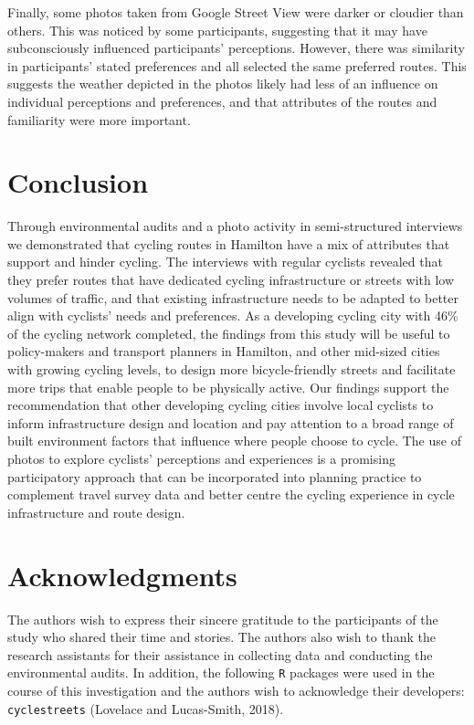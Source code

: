 \documentclass[]{elsarticle} %
\begin{document}
Finally, some photos taken from Google Street View were darker or
cloudier than others. This was noticed by some participants, suggesting
that it may have subconsciously influenced participants' perceptions.
However, there was similarity in participants' stated preferences and
all selected the same preferred routes. This suggests the weather
depicted in the photos likely had less of an influence on individual
perceptions and preferences, and that attributes of the routes and
familiarity were more important.

\hypertarget{sec:conclusion}{%
\section{Conclusion}\label{sec:conclusion}}

Through environmental audits and a photo activity in semi-structured
interviews we demonstrated that cycling routes in Hamilton have a mix of
attributes that support and hinder cycling. The interviews with regular
cyclists revealed that they prefer routes that have dedicated cycling
infrastructure or streets with low volumes of traffic, and that existing
infrastructure needs to be adapted to better align with cyclists' needs
and preferences. As a developing cycling city with 46\% of the cycling
network completed, the findings from this study will be useful to
policy-makers and transport planners in Hamilton, and other mid-sized
cities with growing cycling levels, to design more bicycle-friendly
streets and facilitate more trips that enable people to be physically
active. Our findings support the recommendation that other developing
cycling cities involve local cyclists to inform infrastructure design
and location and pay attention to a broad range of built environment
factors that influence where people choose to cycle. The use of photos
to explore cyclists' perceptions and experiences is a promising
participatory approach that can be incorporated into planning practice
to complement travel survey data and better centre the cycling
experience in cycle infrastructure and route design.

\hypertarget{sec:acknowledgments}{%
\section{Acknowledgments}\label{sec:acknowledgments}}

The authors wish to express their sincere gratitude to the participants
of the study who shared their time and stories. The authors also wish to
thank the research assistants for their assistance in collecting data
and conducting the environmental audits. In addition, the following
\texttt{R} packages were used in the course of this investigation and
the authors wish to acknowledge their developers: \texttt{cyclestreets}
(Lovelace and Lucas-Smith, 2018).
\end{document}
